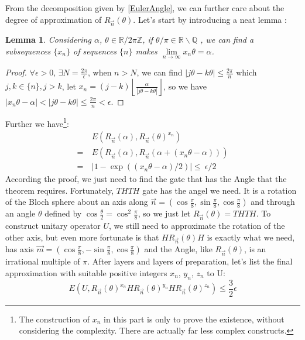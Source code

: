 \documentclass[a4paper,10pt]{article}
\newtheorem{lemma}{Lemma}[subsection]
\numberwithin{equation}{subsection}
\begin{document}
\vspace{.5cm}
From the decomposition given by \ref{EulerAngle}, we can further care about the degree of approximation of $R_{\vec{n}}(\theta)$. Let's start by introducing a neat lemma :
\begin{lemma}\label{AngleCoverR}
    Considering $\alpha$, $\theta \in \mathbb{R} /2\pi\mathbb{Z}$, if $\theta/\pi \in \mathbb{R} \backslash \mathbb{Q}$ , we can find a subsequences $\{x_n\}$ of sequences $\{n\}$ makes $\lim\limits_{n\to\infty}x_n\theta = \alpha$.
\end{lemma}
\begin{proof}
    $\forall \epsilon>0$, $\exists N=\frac{2\pi}{\epsilon}$, when $n>N$, we can find $|j\theta-k\theta|\leq\frac{2\pi}{n}$ which $j,k \in \{n\},j>k$, let $x_{n} = (j-k)\left\lfloor\frac{\alpha}{|j\theta-k\theta|}\right\rfloor$, so we have $|x_{n}\theta-\alpha|<|j\theta-k\theta|\leq\frac{2\pi}{n}<\epsilon$.
\end{proof}
Further we have\footnote{The construction of $x_{n}$ in this part is only to prove the existence, without considering the complexity. There are actually far less complex constructs.}:
\begin{equation}
    \begin{split}
          & \ E(R_{\vec{n}}(\alpha),R_{\vec{n}}(\theta)^{x_{n}})              \\
        = & \ E(R_{\vec{n}}(\alpha),R_{\vec{n}}(\alpha+(x_{n}\theta-\alpha))) \\
        = & \ |1-\exp((x_{n}\theta-\alpha)/2)|\leq\ \epsilon/2
    \end{split}
\end{equation}
According the proof, we just need to find the gate that has the Angle that the theorem requires. Fortunately, $THTH$ gate has the angel we need. It is a rotation of the Bloch sphere about an axis along $\vec{n} = (\cos\frac{\pi}{8},\sin\frac{\pi}{8},\cos\frac{\pi}{8})$ and through an angle $\theta$ defined by $\cos\frac{\theta}{2} = \cos^{2}\frac{\pi}{8}$, so we just let $R_{\vec{n}}(\theta) = THTH$. To construct unitary operator $U$, we still need to approximate the rotation of the other axis, but even more fortunate is that $HR_{\vec{n}}(\theta)H$ is exactly what we need, has axis $\vec{m} = (\cos\frac{\pi}{8},-\sin\frac{\pi}{8},\cos\frac{\pi}{8})$ and the Angle, like $R_{\vec{n}}(\theta)$, is an irrational multiple of $\pi$. After layers and layers of preparation, let's list the final approximation with suitable positive integers $x_{n}$, $y_{n}$, $z_{n}$ to U:
\begin{equation}\label{FinalApproximation}
    E(U,R_{\vec{n}}(\theta)^{x_{n}}HR_{\vec{n}}(\theta)^{y_{n}}HR_{\vec{n}}(\theta)^{z_{n}}) \leq \frac{3}{2}\epsilon
\end{equation}
\end{document}
